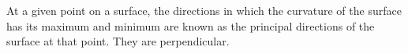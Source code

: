 At a given point on a surface, the directions in which the curvature of the
surface has its maximum and minimum are known as the principal directions
of the surface at that point. They are perpendicular.